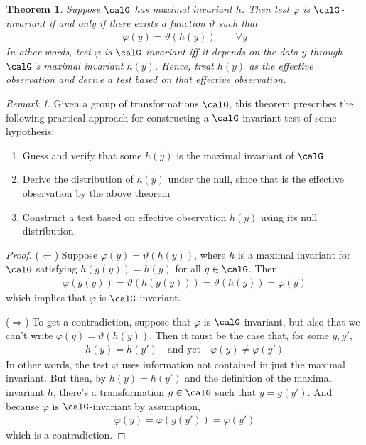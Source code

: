 \documentclass[12pt]{article}
\theoremstyle{plain}
\newtheorem{thm}{Theorem}[section]
\theoremstyle{definition}
\theoremstyle{remark}
\newtheorem*{rmk}{Remark}
\begin{document}
\begin{thm}
Suppose $\calG$ has maximal invariant $h$.
Then test $\varphi$ is $\calG$-invariant if and only if there exists a
function $\vartheta$ such that
\begin{align*}
  \varphi(y) = \vartheta(h(y))
  \qquad\forall y
\end{align*}
In other words, test $\varphi$ is $\calG$-invariant iff it depends
on the data $y$ through $\calG$'s maximal invariant $h(y)$.
Hence, treat $h(y)$ as the effective observation and derive a
test based on that effective observation.
\end{thm}
\begin{rmk}
Given a group of transformations $\calG$,
this theorem prescribes the following practical approach for
constructing a $\calG$-invariant test of some hypothesis:
\begin{enumerate}
  \item Guess and verify that some $h(y)$ is the maximal invariant of
    $\calG$
  \item Derive the distribution of $h(y)$ under the null, since that is
    the effective observation by the above theorem
  \item Construct a test based on effective observation $h(y)$ using its
    null distribution
\end{enumerate}
\end{rmk}

\clearpage
\begin{proof}
($\Leftarrow$)
Suppose $\varphi(y)=\vartheta(h(y))$, where $h$ is a maximal invariant
for $\calG$ satisfying $h(g(y))=h(y)$ for all $g\in\calG$. Then
\begin{align*}
  \varphi(g(y))
  = \vartheta(h(g(y)))
  = \vartheta(h(y))
  = \varphi(y)
\end{align*}
which implies that $\varphi$ is $\calG$-invariant.

($\Rightarrow$)
To get a contradiction, suppose that $\varphi$ is $\calG$-invariant, but
also that we can't write $\varphi(y)=\vartheta(h(y))$.
Then it must be the case that, for some $y,y'$,
\begin{align*}
  h(y)=h(y')
  \quad\text{and yet}\quad
  \varphi(y)\neq\varphi(y')
\end{align*}
In other words, the test $\varphi$ uses information not contained in
just the maximal invariant.
But then, by $h(y)=h(y')$ and the definition of the maximal invariant
$h$, there's a transformation $g\in\calG$ such that
$y=g(y')$. And because $\varphi$ is $\calG$-invariant by assumption,
\begin{align*}
  \varphi(y) = \varphi(g(y')) = \varphi(y')
\end{align*}
which is a contradiction.
\end{proof}
\end{document}
